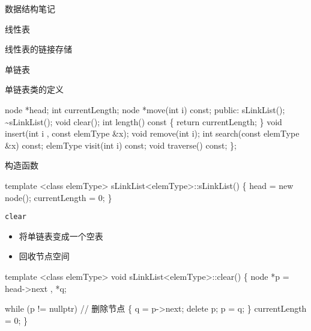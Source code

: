\documentclass[
  ignorenonframetext,
]{beamer}
\newenvironment{Shaded}{}{}
\newcommand{\NormalTok}[1]{#1}
\providecommand{\tightlist}{%
  \setlength{\itemsep}{0pt}\setlength{\parskip}{0pt}}
\begin{document}
\begin{frame}[fragile]{数据结构笔记}
\begin{block}{线性表}
\begin{block}{线性表的链接存储}
\begin{block}{单链表}
\begin{block}{单链表类的定义}
\begin{Shaded}
\begin{Highlighting}[]
\NormalTok{    node *head;}
\NormalTok{    int currentLength;}
\NormalTok{    node *move(int i) const;}
\NormalTok{  public:}
\NormalTok{    sLinkList();}
\NormalTok{    \textasciitilde{}sLinkList();}
\NormalTok{    void clear();}
\NormalTok{    int length() const}
\NormalTok{    \{}
\NormalTok{      return currentLength;}
\NormalTok{    \}}
\NormalTok{    void insert(int i , const elemType \&x);}
\NormalTok{    void remove(int i);}
\NormalTok{    int search(const elemType \&x) const;}
\NormalTok{    elemType visit(int i) const;}
\NormalTok{    void traverse() const;}
\NormalTok{\};}
\end{Highlighting}
\end{Shaded}
\end{block}

\begin{block}{构造函数}
\protect{}\label{ux6784ux9020ux51fdux6570-1}

\begin{Shaded}
\begin{Highlighting}[]
\NormalTok{template \textless{}class elemType\textgreater{}}
\NormalTok{sLinkList\textless{}elemType\textgreater{}::sLinkList()}
\NormalTok{\{}
\NormalTok{  head = new node();}
\NormalTok{  currentLength = 0;}
\NormalTok{\}}
\end{Highlighting}
\end{Shaded}
\end{block}

\begin{block}{\texttt{clear}}
\protect{}\label{clear}
\begin{itemize}
\tightlist
\item
  将单链表变成一个空表
\item
  回收节点空间
\end{itemize}


\begin{Shaded}
\begin{Highlighting}[]
\NormalTok{template \textless{}class elemType\textgreater{}}
\NormalTok{void sLinkList\textless{}elemType\textgreater{}::clear()}
\NormalTok{\{}
\NormalTok{  node *p = head{-}\textgreater{}next , *q;}

\NormalTok{  while (p != nullptr)        // 删除节点}
\NormalTok{  \{}
\NormalTok{    q = p{-}\textgreater{}next;}
\NormalTok{    delete p;}
\NormalTok{    p = q;}
\NormalTok{  \}}
\NormalTok{  currentLength = 0;}
\NormalTok{\}}
\end{Highlighting}
\end{Shaded}
\end{block}


\end{block}
\end{block}
\end{block}
\end{frame}
\end{document}
